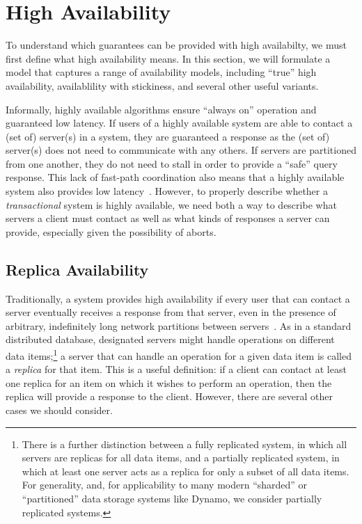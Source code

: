 
\section{High Availability}
\label{sec:availability}

To understand which guarantees can be provided with high availabilty,
we must first define what high availability means. In this section, we
will formulate a model that captures a range of availability models,
including ``true'' high availability, availablility with stickiness,
and several other useful variants.

Informally, highly available algorithms ensure ``always on'' operation
and guaranteed low latency. If users of a highly available system are
able to contact a (set of) server(s) in a system, they are guaranteed
a response as the (set of) server(s) does not need to communicate with
any others. If servers are partitioned from one another, they do not
need to stall in order to provide a ``safe'' query response. This lack
of fast-path coordination also means that a highly available system
also provides low latency~\cite{abadi-pacelc}. However, to properly
describe whether a \textit{transactional} system is highly available,
we need both a way to describe what servers a client must contact as
well as what kinds of responses a server can provide, especially given
the possibility of aborts.

\subsection{Replica Availability}

Traditionally, a system provides high availability if every user that
can contact a server eventually receives a response from that server,
even in the presence of arbitrary, indefinitely long network
partitions between servers~\cite{gilbert-cap}. As in a standard
distributed database, designated servers might handle operations on
different data items;\footnote{There is a further distinction between a
  fully replicated system, in which all servers are replicas for all
  data items, and a partially replicated system, in which at least one
  server acts as a replica for only a subset of all data items. For
  generality, and, for applicability to many modern ``sharded'' or
  ``partitioned'' data storage systems like Dynamo, we consider
  partially replicated systems.} a server that can handle an
operation for a given data item is called a \textit{replica} for that
item. This is a useful definition: if a client can contact at least
one replica for an item on which it wishes to perform an operation,
then the replica will provide a response to the client. However, there
are several other cases we should consider.

